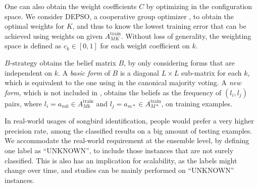 One can also obtain the weight coefficients $C$ by optimizing in the configuration space. We consider DEPSO, a cooperative group optimizer \cite{xie2014cooperative}, to obtain the optimal weights for $K$, and thus to know the lowest training error that can be achieved using weights on given $A_{MK}^\text{train}$. Without loss of generality, the weighting space is defined as $c_k\in [0, 1]$ for each weight coefficient on $k$. 

$B\text{-strategy}$ obtains the belief matrix $B$, by only considering forms that are independent on $k$. A \emph{basic form} of $B$ is a diagonal $L\times L$ sub-matrix for each $k$, which is equivalent to the one using in the canonical majority voting. A \emph{new form}, which is not included in \cite{rokach2010ensemble}, obtains the beliefs as the frequency of $(l_i, l_j)$ pairs, where $l_i=a_{mk} \in A_{Mk}^\text{train}$ and $l_j=a_{m*} \in A_{M*}^\text{train}$, on training examples.

In real-world usages of songbird identification, people would prefer a very higher precision rate, among the classified results on a big amount of testing examples. We accommodate the real-world requirement at the ensemble level, by defining one label as ``UNKNOWN'', to include those instances that are not surely classified. This is also has an implication for scalability, as the labels might change over time, and studies can be mainly performed on ``UNKNOWN'' instances.






